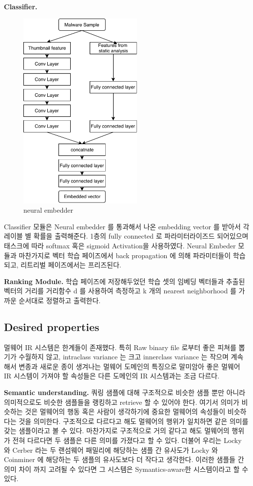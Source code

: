 \textbf{Classifier. }
\begin{figure}
  \includegraphics[height=10cm]{../figures/neural_embedder.pdf}
  \caption{neural embedder}
  \label{fig:three}
\end{figure}
Classifier 모듈은 Neural embedder 를 통과해서 나온 embedding vector 를 받아서 각 레이블 별 확률을 출력해준다. 1층의 fully connected 로 파라미터라이즈드 되어있으며 태스크에 따라 softmax 혹은 sigmoid Activation을 사용하였다. Neural Embeder 모듈과 마찬가지로 벡터 학습 페이즈에서 back propagation 에 의해 파라미터들이 학습되고, 리트리벌 페이즈에서는 프리즈된다. 

\textbf{Ranking Module. }
학습 페이즈에 저장해두었던 학습 셋의 임베딩 벡터들과 추출된 벡터의 거리를 거리함수 d 를 사용하여 측정하고 k 개의 nearest neighborhood 를 가까운 순서대로 정렬하고 출력한다.


\subsection{Desired properties}
멀웨어 IR 시스템은 한계들이 존재했다. 특히 Raw binary file 로부터 좋은 피쳐를 뽑기가 수월하지 않고, intraclass variance 는 크고 innerclass variance 는 작으며 계속해서 변종과 새로운 종이 생겨나는 멀웨어 도메인의 특징으로 말미암아 좋은 멀웨어 IR 시스템이 가져야 할 속성들은 다른 도메인의 IR 시스템과는 조금 다르다.

\textbf{Semantic understanding. }
쿼링 샘플에 대해 구조적으로 비슷한 샘플 뿐만 아니라 의미적으로도 비슷한 샘플들을 랭킹하고 retrieve 할 수 있어야 한다. 여기서 의미가 비슷하는 것은 멀웨어의 행동 혹은 사람이 생각하기에 중요한 멀웨어의 속성들이 비슷하다는 것을 의미한다. 구조적으로 다르다고 해도 멀웨어의 행위가 일치하면 같은 의미를 갖는 샘플이라고 볼 수 있다. 마찬가지로 구조적으로 거의 같다고 해도 멀웨어의 행위가 전혀 다르다면 두 샘플은 다른 의미를 가졌다고 할 수 있다. 더불어 우리는 Locky 와 Cerber 라는 두 랜섬웨어 패밀리에 해당하는 샘플 간 유사도가 Locky 와 Coinminer 에 해당하는 두 샘플의 유사도보다 더 작다고 생각한다. 이러한 샘플들 간 의미 차이 까지 고려될 수 있다면 그 시스템은 Symantics-aware한 시스템이라고 할 수 있다. 
 
